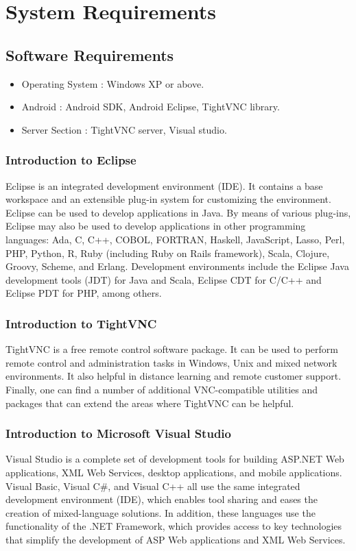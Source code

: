 \chapter{System Requirements}
\label{System Requirements}
\section{Software Requirements}
\begin{itemize}
\item Operating System : Windows XP or above.
\item  Android : Android SDK, Android Eclipse, TightVNC library.
\item Server Section : TightVNC server, Visual studio. 
\end{itemize}

\subsection{Introduction to Eclipse}
\label{Introduction to Eclipse}
	Eclipse is an integrated development environment (IDE). It contains a base workspace and an extensible plug-in system for customizing the environment. Eclipse can be used to develop applications in Java. By means of various plug-ins, Eclipse may also be used to develop applications in other programming languages: Ada, C, C++, COBOL, FORTRAN, Haskell, JavaScript, Lasso, Perl, PHP, Python, R, Ruby (including Ruby on Rails framework), Scala, Clojure, Groovy, Scheme, and Erlang. Development environments include the Eclipse Java development tools (JDT) for Java and Scala, Eclipse CDT for C/C++ and Eclipse PDT for PHP, among others.

\subsection{Introduction to TightVNC}
\label{Introduction to TightVNC}
	TightVNC is a free remote control software package. It can be used to perform remote control and administration tasks in Windows, Unix and mixed network environments. It also helpful in distance learning and remote customer support. Finally, one can find a number of additional VNC-compatible utilities and packages that can extend the areas where TightVNC can be helpful. 
	
\subsection{Introduction to Microsoft Visual Studio }
\label{Introduction to Microsoft Visual Studio}
	Visual Studio is a complete set of development tools for building ASP.NET Web applications, XML Web Services, desktop applications, and mobile applications. Visual Basic, Visual C#, and Visual C++ all use the same integrated development environment (IDE), which enables tool sharing and eases the creation of mixed-language solutions. In addition, these languages use the functionality of the .NET Framework, which provides access to key technologies that simplify the development of ASP Web applications and XML Web Services.

